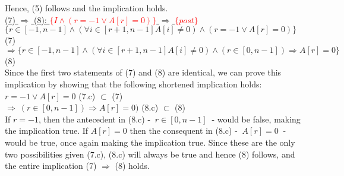 \documentclass[a4paper]{article}
\begin{document}
\begin{enumerate}
\vspace{1mm} 
Hence, (5) follows and the implication holds.\\
\vspace{10mm}
\underline{(7) \(\Rightarrow\) (8): \textcolor{red}{\( \{I \wedge (r = -1 \vee A[r] = 0)\}\)} \(\Rightarrow\)  \textcolor{red}{\(\{post\} \)}}\\
\vspace{4mm}
\qquad \( \{r \in [-1,n-1] \wedge (\forall i \in [r+1,n-1]A[i]\neq 0) \wedge (r = -1 \vee A[r] = 0)\}\) \hfill (7) \\
\vspace{2mm}
\qquad\qquad \( \Rightarrow \{r \in [-1,n-1] \wedge (\forall i \in [r+1,n-1]A[i]\neq 0) \wedge (r \in [0,n-1]) \Rightarrow A[r] = 0\} \) \hfill (8) \\
\vspace{3mm}
Since the first two statements of (7) and (8) are identical, we can prove this implication by showing that the following shortened implication holds:\\
\vspace{2mm}
\qquad \( r = -1 \vee A[r] = 0\) \hfill (7.c) \(\subset\) (7) \\ 
\vspace{2mm}
\qquad\qquad \( \Rightarrow ~(r \in [0,n-1]) \Rightarrow A[r] = 0)\) \hfill (8.c) \(\subset\) (8) \\
\vspace{3mm}
If \( r = -1\), then the antecedent in (8.c) - \(~r \in [0,n-1]~\) - would be false, making the implication true. If \(A[r] = 0\) then the consequent in (8.c) - \(~ A[r] = 0 ~\) - would be true, once again making the implication true. Since these are the only two possibilities given (7.c), (8.c) will always be true and hence (8) follows, and the entire implication (7) \(\Rightarrow\) (8) holds.

\end{enumerate}
\end{document}
